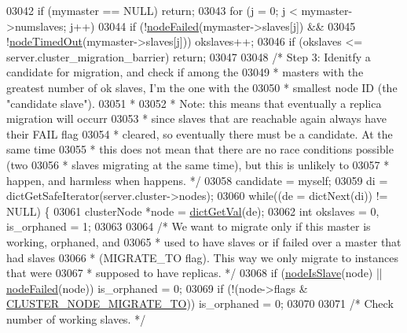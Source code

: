 \begin{DoxyCode}
{{{{{{{{{{{{{{{{{{{{{{{{{{{{{{{{{{{{{{{{{{{{{{{{{{{{{{{{03042     \textcolor{keywordflow}{if} (mymaster == NULL) \textcolor{keywordflow}{return};
03043     \textcolor{keywordflow}{for} (j = 0; j < mymaster->numslaves; j++)
03044         \textcolor{keywordflow}{if} (!\hyperlink{cluster_8h_a6a31c614ff4f5ac8ebaa630b0a921c3d}{nodeFailed}(mymaster->slaves[j]) &&
03045             !\hyperlink{cluster_8h_ac0ab1cbdbc2a49b30c98d73640476e32}{nodeTimedOut}(mymaster->slaves[j])) okslaves++;
03046     \textcolor{keywordflow}{if} (okslaves <= server.cluster\_migration\_barrier) \textcolor{keywordflow}{return};
03047 
03048     \textcolor{comment}{/* Step 3: Idenitfy a candidate for migration, and check if among the}
03049 \textcolor{comment}{     * masters with the greatest number of ok slaves, I'm the one with the}
03050 \textcolor{comment}{     * smallest node ID (the "candidate slave").}
03051 \textcolor{comment}{     *}
03052 \textcolor{comment}{     * Note: this means that eventually a replica migration will occurr}
03053 \textcolor{comment}{     * since slaves that are reachable again always have their FAIL flag}
03054 \textcolor{comment}{     * cleared, so eventually there must be a candidate. At the same time}
03055 \textcolor{comment}{     * this does not mean that there are no race conditions possible (two}
03056 \textcolor{comment}{     * slaves migrating at the same time), but this is unlikely to}
03057 \textcolor{comment}{     * happen, and harmless when happens. */}
03058     candidate = myself;
03059     di = dictGetSafeIterator(server.cluster->nodes);
03060     \textcolor{keywordflow}{while}((de = dictNext(di)) != NULL) \{
03061         clusterNode *node = \hyperlink{dict_8h_ae8d2cc391873b2bea2b87c4f80f43120}{dictGetVal}(de);
03062         \textcolor{keywordtype}{int} okslaves = 0, is\_orphaned = 1;
03063 
03064         \textcolor{comment}{/* We want to migrate only if this master is working, orphaned, and}
03065 \textcolor{comment}{         * used to have slaves or if failed over a master that had slaves}
03066 \textcolor{comment}{         * (MIGRATE\_TO flag). This way we only migrate to instances that were}
03067 \textcolor{comment}{         * supposed to have replicas. */}
03068         \textcolor{keywordflow}{if} (\hyperlink{cluster_8h_a3c99881f6892130c902b42b1f84a0e11}{nodeIsSlave}(node) || \hyperlink{cluster_8h_a6a31c614ff4f5ac8ebaa630b0a921c3d}{nodeFailed}(node)) is\_orphaned = 0;
03069         \textcolor{keywordflow}{if} (!(node->flags & \hyperlink{cluster_8h_a1d5a62356ed9f5986613c2315a358119}{CLUSTER\_NODE\_MIGRATE\_TO})) is\_orphaned = 0;
03070 
03071         \textcolor{comment}{/* Check number of working slaves. */}
}}}}}}}}}}}}}}}}}}}}}}}}}}}}}}}}}}}}}}}}}}}}}}}}}}}}}}}}
\end{DoxyCode}
